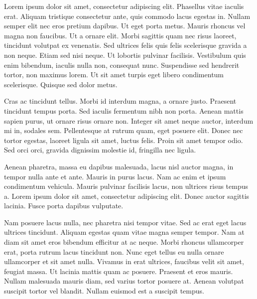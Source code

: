 \begin{resumo}
Lorem ipsum dolor sit amet, consectetur adipiscing elit. Phasellus vitae iaculis erat. Aliquam tristique consectetur ante, quis commodo lacus egestas in. Nullam semper elit nec eros pretium dapibus. Ut eget porta metus. Mauris rhoncus vel magna non faucibus. Ut a ornare elit. Morbi sagittis quam nec risus laoreet, tincidunt volutpat ex venenatis. Sed ultrices felis quis felis scelerisque gravida a non neque. Etiam sed nisi neque. Ut lobortis pulvinar facilisis. Vestibulum quis enim bibendum, iaculis nulla non, consequat nunc. Suspendisse sed hendrerit tortor, non maximus lorem. Ut sit amet turpis eget libero condimentum scelerisque. Quisque sed dolor metus.

Cras ac tincidunt tellus. Morbi id interdum magna, a ornare justo. Praesent tincidunt tempus porta. Sed iaculis fermentum nibh non porta. Aenean mattis sapien purus, ut ornare risus ornare non. Integer sit amet neque auctor, interdum mi in, sodales sem. Pellentesque at rutrum quam, eget posuere elit. Donec nec tortor egestas, laoreet ligula sit amet, luctus felis. Proin sit amet tempor odio. Sed orci orci, gravida dignissim molestie id, fringilla nec ligula.

Aenean pharetra, massa eu dapibus malesuada, lacus nisl auctor magna, in tempor nulla ante et ante. Mauris in purus lacus. Nam ac enim et ipsum condimentum vehicula. Mauris pulvinar facilisis lacus, non ultrices risus tempus a. Lorem ipsum dolor sit amet, consectetur adipiscing elit. Donec auctor sagittis lacinia. Fusce porta dapibus vulputate.

Nam posuere lacus nulla, nec pharetra nisi tempor vitae. Sed ac erat eget lacus ultrices tincidunt. Aliquam egestas quam vitae magna semper tempor. Nam at diam sit amet eros bibendum efficitur at ac neque. Morbi rhoncus ullamcorper erat, porta rutrum lacus tincidunt non. Nunc eget tellus eu nulla ornare ullamcorper et sit amet nulla. Vivamus in erat ultrices, faucibus velit sit amet, feugiat massa. Ut lacinia mattis quam ac posuere. Praesent et eros mauris. Nullam malesuada mauris diam, sed varius tortor posuere at. Aenean volutpat suscipit tortor vel blandit. Nullam euismod est a suscipit tempus.
\end{resumo}


